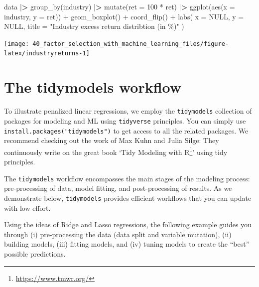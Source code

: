 \documentclass[
]{book}
\newenvironment{Shaded}{\begin{snugshade}}{\end{snugshade}}
\newcommand{\AttributeTok}[1]{\textcolor[rgb]{0.61,0.61,0.61}{#1}}
\newcommand{\ConstantTok}[1]{\textcolor[rgb]{0,0,0}{#1}}
\newcommand{\DecValTok}[1]{\textcolor[rgb]{0.06,0.06,0.06}{#1}}
\newcommand{\ErrorTok}[1]{\textcolor[rgb]{0.14,0.14,0.14}{\textbf{#1}}}
\newcommand{\FunctionTok}[1]{\textcolor[rgb]{0,0,0}{#1}}
\newcommand{\NormalTok}[1]{#1}
\newcommand{\SpecialCharTok}[1]{\textcolor[rgb]{0,0,0}{#1}}
\newcommand{\StringTok}[1]{\textcolor[rgb]{0.5,0.5,0.5}{#1}}
\renewcommand{\href}[2]{#2\footnote{\url{#1}}}
\begin{document}
\begin{Shaded}
\begin{Highlighting}[]
\NormalTok{data }\SpecialCharTok{|}\ErrorTok{\textgreater{}}
  \FunctionTok{group\_by}\NormalTok{(industry) }\SpecialCharTok{|}\ErrorTok{\textgreater{}}
  \FunctionTok{mutate}\NormalTok{(}\AttributeTok{ret =} \DecValTok{100} \SpecialCharTok{*}\NormalTok{ ret) }\SpecialCharTok{|}\ErrorTok{\textgreater{}}
  \FunctionTok{ggplot}\NormalTok{(}\FunctionTok{aes}\NormalTok{(}\AttributeTok{x =}\NormalTok{ industry, }\AttributeTok{y =}\NormalTok{ ret)) }\SpecialCharTok{+}
  \FunctionTok{geom\_boxplot}\NormalTok{() }\SpecialCharTok{+}
  \FunctionTok{coord\_flip}\NormalTok{() }\SpecialCharTok{+}
  \FunctionTok{labs}\NormalTok{(}
    \AttributeTok{x =} \ConstantTok{NULL}\NormalTok{, }\AttributeTok{y =} \ConstantTok{NULL}\NormalTok{,}
    \AttributeTok{title =} \StringTok{"Industry excess return distribtion (in \%)"}
\NormalTok{  )}
\end{Highlighting}
\end{Shaded}

\begin{center}\texttt{[image: 40\_factor\_selection\_with\_machine\_learning\_files/figure-latex/industryreturns-1]} \end{center}

\hypertarget{the-tidymodels-workflow}{%
\section{The tidymodels workflow}\label{the-tidymodels-workflow}}

To illustrate penalized linear regressions, we employ the \texttt{tidymodels} collection of packages for modeling and ML using \texttt{tidyverse} principles. You can simply use \texttt{install.packages("tidymodels")} to get access to all the related packages. We recommend checking out the work of Max Kuhn and Julia Silge: They continuously write on the great book `\href{https://www.tmwr.org/}{Tidy Modeling with R}' using tidy principles.

The \texttt{tidymodels} workflow encompasses the main stages of the modeling process: pre-processing of data, model fitting, and post-processing of results. As we demonstrate below, \texttt{tidymodels} provides efficient workflows that you can update with low effort.

Using the ideas of Ridge and Lasso regressions, the following example guides you through (i) pre-processing the data (data split and variable mutation), (ii) building models, (iii) fitting models, and (iv) tuning models to create the ``best'' possible predictions.
\end{document}
